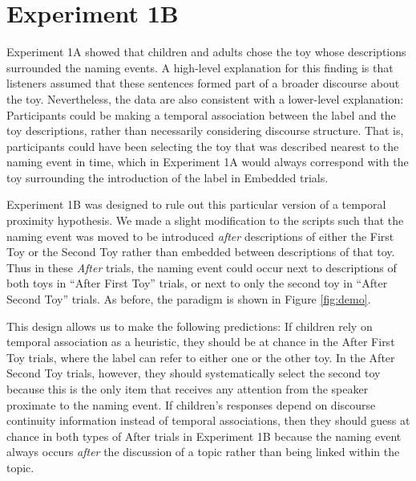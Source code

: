 \documentclass[man]{apa2}
\begin{document}


 
 
\section{Experiment 1B}

Experiment 1A showed that children and adults chose the toy whose descriptions surrounded the naming events. A high-level explanation for this finding is that listeners assumed that these sentences formed part of a broader discourse about the toy. Nevertheless, the data are also consistent with a lower-level explanation: Participants could be making a temporal association between the label and the toy descriptions, rather than necessarily considering discourse structure. That is, participants could have been selecting the toy that was described nearest to the naming event in time, which in Experiment 1A would always correspond with the toy surrounding the introduction of the label in Embedded trials. 

Experiment 1B was designed to rule out this particular version of a temporal proximity hypothesis.  We made a slight modification to the scripts such that the naming event was moved to be introduced \emph{after} descriptions of either the First Toy or the Second Toy rather than embedded between descriptions of that toy.  
Thus in these \emph{After} trials, the naming event could occur next to descriptions of both toys in ``After First Toy'' trials, or next to only the second toy in ``After Second Toy'' trials. As before, the paradigm is shown in Figure \ref{fig:demo}.

This design allows us to make the following predictions:  If children rely on temporal association as a heuristic, they should be at chance in the After First Toy trials, where the label can refer to either one or the other toy.  In the After Second Toy trials, however, they should systematically select the second toy because this is the only item that receives any attention from the speaker proximate to the naming event. If children's responses depend on discourse continuity information instead of temporal associations, then they should guess at chance in both types of After trials in Experiment 1B because the naming event always occurs \emph{after} the discussion of a topic rather than being linked within the topic. 
\end{document}
